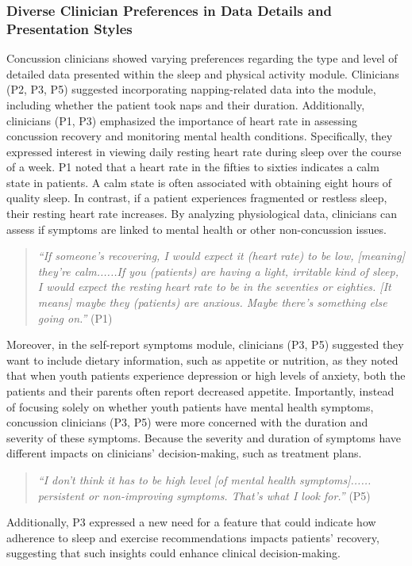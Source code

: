 \subsubsection{Diverse Clinician Preferences in Data Details and Presentation Styles}
\label{subsubsec:detaileddata}
Concussion clinicians showed varying preferences regarding the type and level of detailed data presented within the sleep and physical activity module. 
Clinicians (P2, P3, P5) suggested incorporating napping-related data into the module, including whether the patient took naps and their duration. 
Additionally, clinicians (P1, P3) emphasized the importance of heart rate in assessing concussion recovery and monitoring mental health conditions. Specifically, they expressed interest in viewing daily resting heart rate during sleep over the course of a week. 
P1 noted that a heart rate in the fifties to sixties indicates a calm state in patients. A calm state is often associated with obtaining eight hours of quality sleep. 
In contrast, if a patient experiences fragmented or restless sleep, their resting heart rate increases. 
By analyzing physiological data, clinicians can assess if symptoms are linked to mental health or other non-concussion issues.
\begin{quote}
    \textit{``If someone's recovering, I would expect it (heart rate) to be low, [meaning] they're calm......If you (patients) are having a light, irritable kind of sleep, I would expect the resting heart rate to be in the seventies or eighties. [It means] maybe they (patients) are anxious. Maybe there's something else going on.''} (P1)
\end{quote}
Moreover, in the self-report symptoms module, clinicians (P3, P5) suggested they want to include dietary information, such as appetite or nutrition, as they noted that when youth patients experience depression or high levels of anxiety, both the patients and their parents often report decreased appetite. Importantly, instead of focusing solely on whether youth patients have mental health symptoms, concussion clinicians (P3, P5) were more concerned with the duration and severity of these symptoms. Because the severity and duration of symptoms have different impacts on clinicians' decision-making, such as treatment plans.
\begin{quote}
    \textit{``I don't think it has to be high level [of mental health symptoms]...... persistent or non-improving symptoms. That's what I look for.''} (P5)
\end{quote}
Additionally, P3 expressed a new need for a feature that could indicate how adherence to sleep and exercise recommendations impacts patients' recovery, suggesting that such insights could enhance clinical decision-making. 


